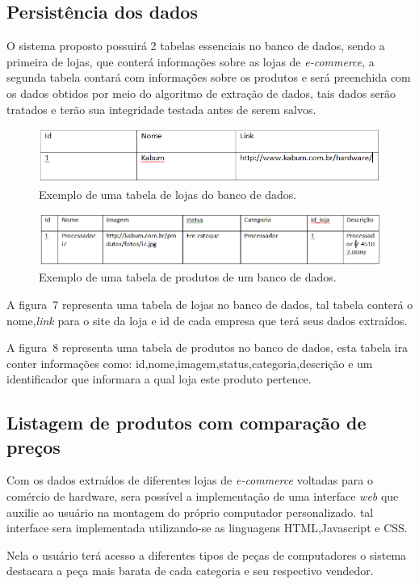 \subsection{Persistência dos dados}

O sistema proposto possuirá 2 tabelas essenciais no banco de dados, sendo a primeira de lojas, que conterá informações sobre as lojas de \emph{e-commerce}, a segunda tabela contará com informações sobre os produtos e será preenchida com os dados obtidos por meio do algoritmo de extração de dados, tais dados serão tratados e terão sua integridade testada antes de serem salvos.

\begin{figure}[!h!t!b]
\centering
\includegraphics[width=\columnwidth]{img/imagem8-tcc}
\caption{Exemplo de uma tabela de lojas do banco de dados.}
\end{figure}



\begin{figure}[!h!t!b]
\centering
\includegraphics[width=\columnwidth]{img/imagem9-tcc}
\caption{Exemplo de uma tabela de produtos de um banco de dados.}
\end{figure}

A figura~7 representa uma tabela de lojas no banco de dados, tal tabela conterá o nome,\emph{link} para o site da loja e id de cada empresa que terá seus dados extraídos.

A figura~8 representa uma tabela de produtos no banco de dados, esta tabela ira conter informações como: id,nome,imagem,status,categoria,descrição e um identificador que informara a qual loja este produto pertence.


\subsection{Listagem de produtos com comparação de preços}

Com os dados extraídos de diferentes lojas de \emph{e-commerce} voltadas para o comércio de hardware, sera possível a implementação de uma interface \emph{web} que auxilie ao usuário na montagem do próprio computador personalizado. tal interface sera implementada utilizando-se as linguagens HTML,Javascript e CSS. 


Nela o usuário terá acesso a diferentes tipos de peças de computadores o sistema destacara a peça mais barata de cada categoria e seu respectivo vendedor.


